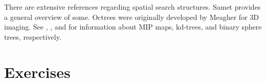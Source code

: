 There are extensive references regarding spatial search structures. Samet \cite{Samet90} provides a general overview of some. Octrees were originally developed by Meagher \cite{Meagher82} for 3D imaging. See \cite{Williams83}, \cite{Bentley75}, and \cite{Quinlan94} for information about MIP maps, kd-trees, and binary sphere trees, respectively.

\printbibliography


\section{Exercises}
